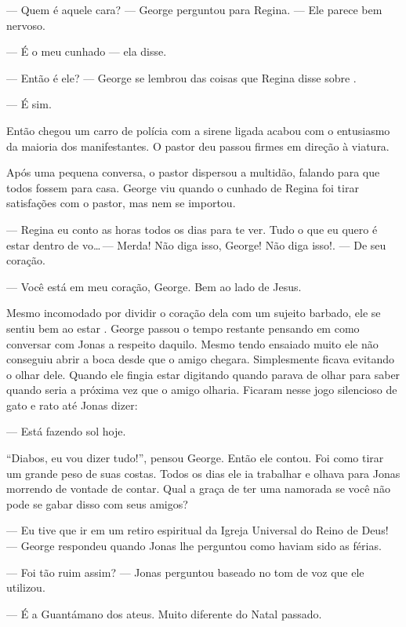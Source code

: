--- Quem é aquele cara? --- George perguntou para Regina. --- Ele parece bem nervoso.

--- É o meu cunhado --- ela disse.

--- Então é ele? --- George se lembrou das coisas que Regina disse sobre .

--- É\mudanca{,} sim.

Então\mudanca{,} chegou um carro de polícia\mudanca{,} com a sirene ligada\mudanca{,}  acabou com o entusiasmo da maioria dos manifestantes. O pastor deu passou firmes em direção à viatura.

Após uma pequena conversa, o pastor dispersou a multidão, falando para que todos fossem para casa. George viu quando o cunhado de Regina foi tirar satisfações com o pastor, mas nem se importou.

--- Regina\mudanca{,} eu conto as horas todos os dias para te ver. Tudo o que eu quero é estar dentro de vo\ldots\,--- Merda! Não diga isso, George! Não diga isso!. --- De seu coração.

--- Você está em meu coração, George. Bem ao lado de Jesus.

Mesmo incomodado por dividir o coração dela com um sujeito barbado, ele se sentiu bem ao estar .  George passou o tempo restante pensando em como conversar com Jonas a respeito daquilo. Mesmo tendo ensaiado muito ele não conseguiu abrir a boca desde que o amigo chegara. Simplesmente ficava evitando o olhar dele. Quando  ele fingia estar digitando\mudanca{;} quando parava de olhar para saber quando seria a próxima vez que o amigo olharia. Ficaram nesse jogo silencioso de gato e rato até Jonas dizer:

--- Está fazendo sol hoje.

``Diabos, eu vou dizer tudo!'', pensou George. Então ele contou. Foi como tirar um grande peso de suas costas. Todos os dias ele ia trabalhar e olhava para Jonas morrendo de vontade de contar. Qual a graça de ter uma namorada se você não pode se gabar disso com seus amigos?

--- Eu tive que ir em um retiro espiritual da Igreja Universal do Reino de Deus! --- George respondeu quando Jonas lhe perguntou como haviam sido as férias.

--- Foi tão ruim assim? --- Jonas perguntou\mudanca{,} baseado no tom de voz que ele utilizou.

--- É a Guantámano dos ateus. Muito diferente do Natal passado.

